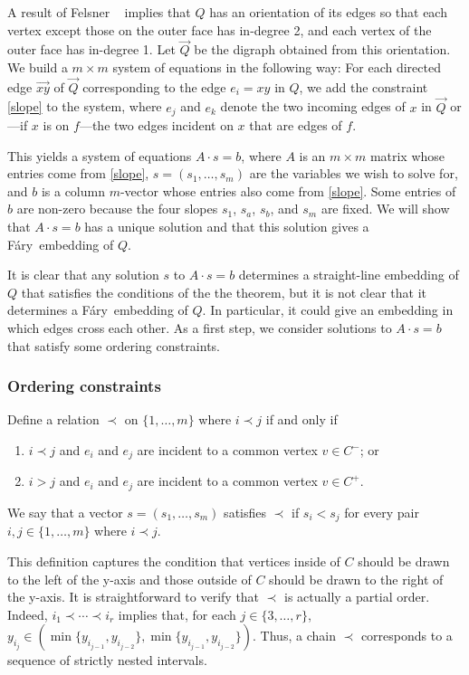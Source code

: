 \documentclass{patmorin}
\newcommand{\Fary}{Fáry}
\begin{document}
A result of Felsner \etal\ \cite[Lemma~2.7]{felsner.huemer.ea:binary}
implies that $Q$ has an orientation of its edges so that each vertex
except those on the outer face has in-degree 2, and each vertex of
the outer face has in-degree 1.  Let $\vec{Q}$ be the digraph obtained
from this orientation. We build a $m\times m$ system of equations in
the following way: For each directed edge $\vec{xy}$ of $\vec{Q}$
corresponding to the edge $e_i=xy$ in $Q$, we add the constraint
\eqref{slope} to the system, where $e_j$ and $e_k$ denote the two incoming
edges of $x$ in $\vec{Q}$ or---if $x$ is on $f$---the two edges incident
on $x$ that are edges of $f$.

This yields a system of equations $A\cdot s = b$, where $A$ is an $m\times
m$ matrix whose entries come from \eqref{slope}, $s=(s_1,\ldots,s_m)$
are the variables we wish to solve for, and $b$ is a column $m$-vector
whose entries also come from \eqref{slope}.  Some entries of $b$
are non-zero because the four slopes $s_1$, $s_a$, $s_b$, and $s_m$
are fixed.  We will show that $A\cdot s=b$ has a unique solution and
that this solution gives a \Fary\ embedding of $Q$.

It is clear that any solution $s$ to $A\cdot s=b$ determines a
straight-line embedding of $Q$ that satisfies the conditions of the the
theorem, but it is not clear that it determines a \Fary\ embedding of $Q$.
In particular, it could give an embedding in which edges cross each other.
As a first step, we consider solutions to $A\cdot s=b$ that satisfy some
ordering constraints.

\subsubsection{Ordering constraints}

Define a relation $\prec$ on $\{1,\ldots,m\}$ where $i \prec j$
if and only if
\begin{enumerate}
  \item $i \prec j$ and $e_i$ and $e_j$ are incident to a common vertex
  $v\in C^-$; or
  \item $i > j$ and $e_i$ and $e_j$ are incident to a common vertex $v\in C^+$.
\end{enumerate}
We say that a vector $s=(s_1,\ldots,s_m)$ satisfies $\prec$ if $s_i <
s_j$ for every pair $i,j\in\{1,\ldots,m\}$ where $i\prec j$.  

This definition captures the condition that vertices inside of $C$
should be drawn to the left of the y-axis and those outside of $C$
should be drawn to the right of the y-axis.  It is straightforward
to verify that $\prec$ is actually a partial order. Indeed, $i_1\prec
\cdots \prec i_r$ implies that, for each $j\in\{3,\ldots,r\}$, $y_{i_j}\in
(\min\{y_{i_{j-1}},y_{i_{j-2}}\}, \min\{y_{i_{j-1}},y_{i_{j-2}}\})$. Thus,
a chain $\prec$ corresponds to a sequence of strictly nested intervals.
\end{document}
